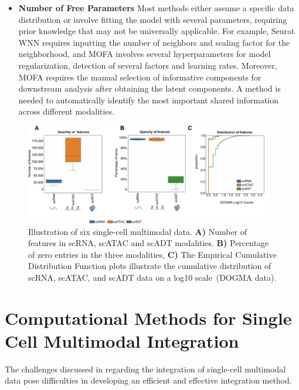 \begin{itemize}
    \item \textbf{Number of Free Parameters}
    Most methods either assume a specific data distribution or involve fitting the model with several parameters, requiring prior knowledge that may not be universally applicable. For example, Seurat WNN requires inputting the number of neighbors and scaling factor for the neighborhood, and MOFA involves several hyperparameters for model regularization, detection of several factors and learning rates. Moreover, MOFA requires the manual selection of informative components for downstream analysis after obtaining the latent components. A method is needed to automatically identify the most important shared information across different modalities.

\end{itemize}

\begin{figure}[!ht]
	\centering
	\includegraphics[width=0.95\textwidth]{feature_statistic/fig}
	\vspace{0.1cm}
	\caption[features characteristics comparison showing the challenge of multimodal integration.]{Illustration of six single-cell multimodal data. \textbf{A)} Number of features in scRNA, scATAC and scADT modalities. \textbf{B)} Percentage of zero entries in the three modalities, \textbf{C)} The Empirical Cumulative Distribution Function plots illustrate the cumulative distribution of scRNA, scATAC, and scADT data on a log10 scale~(DOGMA data).}
	\label{fig:modalities_differences}
\end{figure}



\section{Computational Methods for Single Cell Multimodal Integration}
\label{bgInte:integration}
The challenges discussed in  regarding the integration of single-cell multimodal data pose difficulties in developing an efficient and effective integration method.

